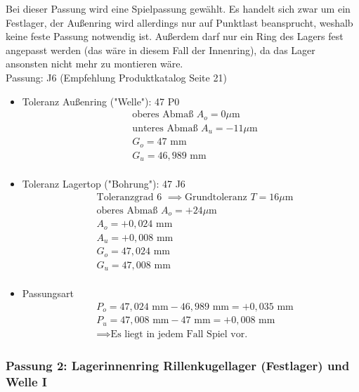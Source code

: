 Bei dieser Passung wird eine Spielpassung gewählt. Es handelt sich zwar um ein Festlager, der Außenring wird allerdings nur auf Punktlast beansprucht, weshalb keine feste Passung notwendig ist. Außerdem darf nur ein Ring des Lagers fest angepasst werden (das wäre in diesem Fall der Innenring), da das Lager ansonsten nicht mehr zu montieren wäre. \\ 
Passung: J6 (Empfehlung Produktkatalog Seite 21)
\begin{itemize}
	\item Toleranz Außenring ("Welle"): 47 P0 
	\begin{align*}
	&\text{oberes Abmaß } A_o = 0 \mu\text{m} \\
	&\text{unteres Abmaß } A_u = -11 \mu\text{m} \\
	&G_o = 47 \text{ mm} \\
	&G_u = 46,989 \text{ mm}\\
	\end{align*} 
	\item Toleranz Lagertop ("Bohrung"): 47 J6
	\begin{align*}
	&\text{Toleranzgrad 6 } \implies \text{Grundtoleranz } T=16 \mu\text{m} \\
	&\text{oberes Abmaß } A_o = +24 \mu\text{m} \\
	&A_o = +0,024 \text{ mm} \\
	&A_u = +0,008 \text{ mm} \\
	&G_o = 47,024 \text{ mm} \\
	&G_u = 47,008 \text{ mm}\\
	\end{align*} 
	\item Passungsart
	\begin{align*}
	&P_o = 47,024 \text{ mm} - 46,989 \text{ mm} = +0,035 \text{ mm} \\
	&P_u =47,008 \text{ mm} - 47 \text{ mm} = +0,008 \text{ mm}\\
	&\implies \text{Es liegt in jedem Fall Spiel vor.}
	\end{align*} 
\end{itemize}
\newpage

\subsubsection{Passung 2: Lagerinnenring Rillenkugellager (Festlager) und Welle I}

